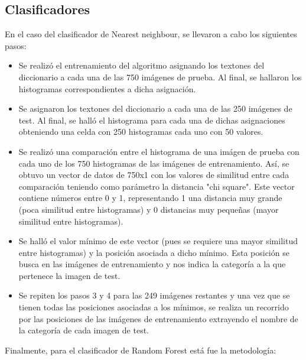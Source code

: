 \documentclass[10pt,twocolumn,letterpaper]{article}
\begin{document}
\subsection{Clasificadores}

En el caso del clasificador de Nearest neighbour, se llevaron a cabo los siguientes pasos:

\begin{itemize}
\item Se realizó el entrenamiento del algoritmo asignando los textones del diccionario a cada una de las 750 imágenes de prueba. Al final, se hallaron los histogramas correspondientes a dicha asignación.

\item Se asignaron los textones del diccionario a cada una de las 250 imágenes de test. Al final, se halló el histograma para cada una de dichas asignaciones obteniendo una celda con 250 histogramas cada uno con 50 valores.

\item Se realizó una comparación entre el histograma de una imágen de prueba con cada uno de los 750 histogramas de las imágenes de entrenamiento. Así, se obtuvo un vector de datos de 750x1 con los valores de similitud entre cada comparación teniendo como parámetro la distancia "chi square". Este vector contiene números entre 0 y 1, representando 1 una distancia muy grande (poca similitud entre histogramas) y 0 distancias muy pequeñas (mayor similitud entre histogramas).

\item Se halló el valor mínimo de este vector (pues se requiere una mayor similitud entre histogramas) y la posición asociada a dicho mínimo. Esta posición se busca en las imágenes de entrenamiento y nos indica la categoría a la que pertenece la imagen de test.

\item Se repiten los pasos 3 y 4 para las 249 imágenes restantes y una vez que se tienen todas las posiciones asociadas a los mínimos, se realiza un recorrido por las posiciones de las imágenes de entrenamiento extrayendo el nombre de la categoría de cada imagen de test.

\end{itemize}

Finalmente, para el clasificador de Random Forest está fue la metodología: 
\end{document}
